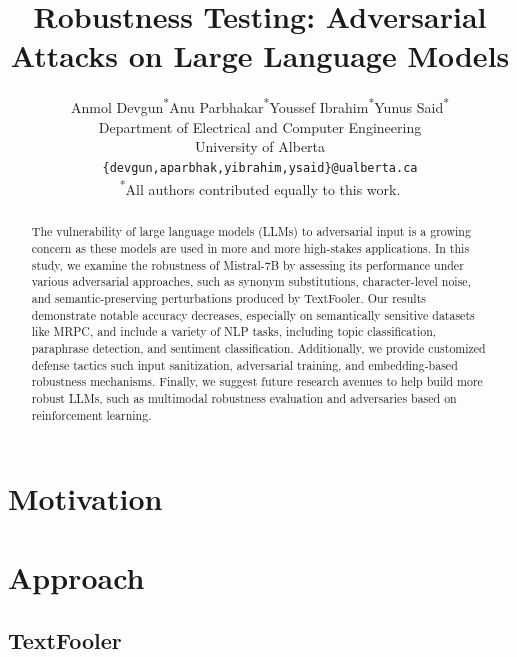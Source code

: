 \documentclass[conference]{IEEEtran}
\title{Robustness Testing: Adversarial Attacks on Large Language Models}
\author{
Anmol Devgun\textsuperscript{*}\quad Anu Parbhakar\textsuperscript{*}\quad Youssef Ibrahim\textsuperscript{*}\quad Yunus Said\textsuperscript{*} \\
Department of Electrical and Computer Engineering \\
University of Alberta \\
\texttt{\{devgun,aparbhak,yibrahim,ysaid\}@ualberta.ca} \\
\textsuperscript{*}All authors contributed equally to this work.
}
\begin{document}
\maketitle

\begin{abstract}
The vulnerability of large language models (LLMs) to adversarial input is a growing concern as these models are used in more and more high-stakes applications.  In this study, we examine the robustness of Mistral-7B by assessing its performance under various adversarial approaches, such as synonym substitutions, character-level noise, and semantic-preserving perturbations produced by TextFooler.  Our results demonstrate notable accuracy decreases, especially on semantically sensitive datasets like MRPC, and include a variety of NLP tasks, including topic classification, paraphrase detection, and sentiment classification.  Additionally, we provide customized defense tactics such input sanitization, adversarial training, and embedding-based robustness mechanisms.  Finally, we suggest future research avenues to help build more robust LLMs, such as multimodal robustness evaluation and adversaries based on reinforcement learning.
\end{abstract}


\section{Motivation}


\section{Approach}

\subsection{TextFooler}
\end{document}
